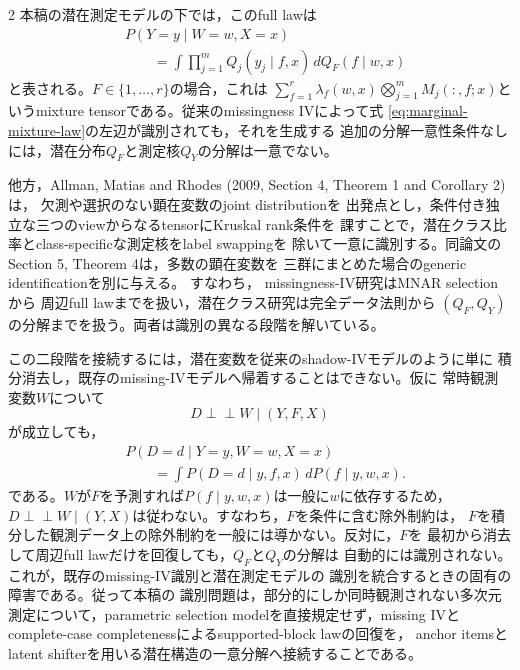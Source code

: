 \documentclass[a4paper,10pt]{article}
\newcommand{\indep}{\mathrel{\perp\!\!\!\perp}}
\begin{document}
\begin{multicols}{2}
本稿の潜在測定モデルの下では，このfull lawは
\begin{equation}
\begin{aligned}
&P(Y=y\mid W=w,X=x)\\
&\qquad=\int\prod_{j=1}^m Q_j(y_j\mid f,x)\,
 dQ_F(f\mid w,x)
\end{aligned}
\label{eq:marginal-mixture-law}
\end{equation}
と表される。$F\in\{1,\ldots,r\}$の場合，これは
$\sum_{f=1}^r\lambda_f(w,x)\bigotimes_{j=1}^m M_j(:,f;x)$というmixture
tensorである。従来のmissingness IVによって式
\eqref{eq:marginal-mixture-law}の左辺が識別されても，それを生成する
追加の分解一意性条件なしには，潜在分布$Q_F$と測定核$Q_Y$の分解は一意でない。

他方，Allman, Matias and Rhodes (2009, Section 4, Theorem 1 and Corollary 2)は，
欠測や選択のない顕在変数のjoint distributionを
出発点とし，条件付き独立な三つのviewからなるtensorにKruskal rank条件を
課すことで，潜在クラス比率とclass-specificな測定核をlabel swappingを
除いて一意に識別する。同論文のSection 5, Theorem 4は，多数の顕在変数を
三群にまとめた場合のgeneric identificationを別に与える。
すなわち，
missingness-IV研究はMNAR selectionから
周辺full lawまでを扱い，潜在クラス研究は完全データ法則から
$(Q_F,Q_Y)$の分解までを扱う。両者は識別の異なる段階を解いている。

この二段階を接続するには，潜在変数を従来のshadow-IVモデルのように単に
積分消去し，既存のmissing-IVモデルへ帰着することはできない。仮に
常時観測変数$W$について
\begin{equation}
D\indep W\mid(Y,F,X)
\label{eq:latent-shifter-exclusion}
\end{equation}
が成立しても，
\begin{equation}
\begin{aligned}
&P(D=d\mid Y=y,W=w,X=x)\\
&\qquad=
\int P(D=d\mid y,f,x)\,dP(f\mid y,w,x).
\end{aligned}
\label{eq:latent-shifter-marginal-selection}
\end{equation}
である。$W$が$F$を予測すれば$P(f\mid y,w,x)$は一般に$w$に依存するため，
$D\indep W\mid(Y,X)$は従わない。すなわち，$F$を条件に含む除外制約は，
$F$を積分した観測データ上の除外制約を一般には導かない。反対に，$F$を
最初から消去して周辺full lawだけを回復しても，$Q_F$と$Q_Y$の分解は
自動的には識別されない。これが，既存のmissing-IV識別と潜在測定モデルの
識別を統合するときの固有の障害である。従って本稿の
識別問題は，部分的にしか同時観測されない多次元測定について，parametric selection
modelを直接規定せず，missing IVとcomplete-case completenessによるsupported-block lawの回復を，
anchor itemsとlatent shifterを用いる潜在構造の一意分解へ接続することである。


\end{multicols}
\end{document}
